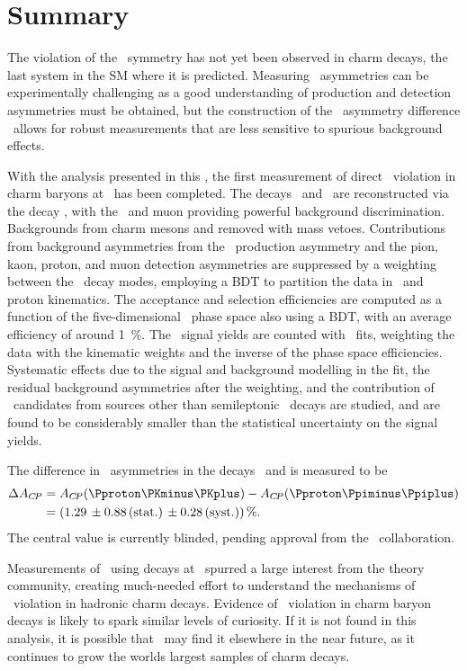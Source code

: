 \chapter{Summary}
\label{chap:cpv:summary}

The violation of the \CP\ symmetry has not yet been observed in charm decays, 
the last system in the \ac{SM} where it is predicted.
Measuring \CP\ asymmetries can be experimentally challenging as a good 
understanding of production and detection asymmetries must be obtained, but the 
construction of the \CP\ asymmetry difference \dACP\ allows for robust 
measurements that are less sensitive to spurious background effects.

With the analysis presented in this , the first measurement 
of direct \CP\ violation in charm baryons at \lhcb\ has been completed.
The decays \LcTopKK\ and \LcToppipi\ are reconstructed via the decay 
\LbToLcmuX, with the \PLambdab\ and muon providing powerful background 
discrimination.
Backgrounds from charm mesons and removed with mass vetoes.
Contributions from background asymmetries from the \PLambdab\ production 
asymmetry and the pion, kaon, proton, and muon detection asymmetries are 
suppressed by a weighting between the \PLambdac\ decay modes, employing a 
\acl{BDT} to partition the data in \PLambdac\ and proton kinematics.
The acceptance and selection efficiencies are computed as a function of the 
five-dimensional \PLambdac\ phase space also using a \ac{BDT}, with an average 
efficiency of around \SI{1}{\percent}.
The \PLambdac\ signal yields are counted with \chisq\ fits, weighting the data 
with the kinematic weights and the inverse of the phase space efficiencies.
Systematic effects due to the signal and background modelling in the fit, the 
residual background asymmetries after the weighting, and the contribution of 
\PLambdac\ candidates from sources other than semileptonic \PLambdac\ decays 
are studied, and are found to be considerably smaller than the statistical 
uncertainty on the signal yields.

The difference in \CP\ asymmetries in the decays \LcTopKK\ and \LcToppipi is 
measured to be
\begin{align*}
  \dACP &= \ACP(\pKK) - \ACP(\ppipi) \\
        &= \SIerrs{\deltaACPval}{\deltaACPunc}{0.28}{\percent}.
\end{align*}
The central value is currently blinded, pending approval from the \lhcb\ 
collaboration.

Measurements of \dACP\ using \PDzero decays at \lhcb\ spurred a large interest 
from the theory community, creating much-needed effort to understand the 
mechanisms of \CP\ violation in hadronic charm decays.
Evidence of \CP\ violation in charm baryon decays is likely to spark similar 
levels of curiosity.
If it is not found in this analysis, it is possible that \lhcb\ may find it 
elsewhere in the near future, as it continues to grow the worlds largest 
samples of charm decays.
